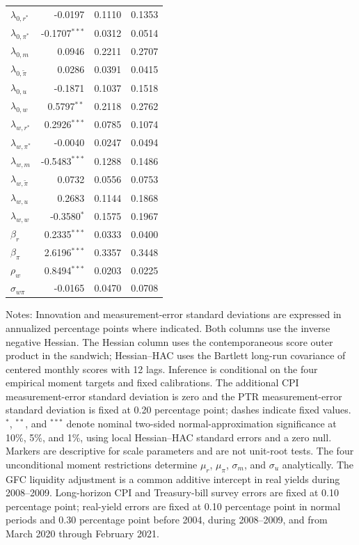\begin{table}[!htbp]
\begin{threeparttable}
\begin{tabular*}{\textwidth}{@{\extracolsep{\fill}}lrrr}
$\lambda_{0,r^*}$ & -0.0197 & 0.1110 & 0.1353 \\
$\lambda_{0,\pi^*}$ & -0.1707$^{***}$ & 0.0312 & 0.0514 \\
$\lambda_{0,m}$ & 0.0946 & 0.2211 & 0.2707 \\
$\lambda_{0,\widetilde\pi}$ & 0.0286 & 0.0391 & 0.0415 \\
$\lambda_{0,u}$ & -0.1871 & 0.1037 & 0.1518 \\
$\lambda_{0,w}$ & 0.5797$^{**}$ & 0.2118 & 0.2762 \\
$\lambda_{w,r^*}$ & 0.2926$^{***}$ & 0.0785 & 0.1074 \\
$\lambda_{w,\pi^*}$ & -0.0040 & 0.0247 & 0.0494 \\
$\lambda_{w,m}$ & -0.5483$^{***}$ & 0.1288 & 0.1486 \\
$\lambda_{w,\widetilde\pi}$ & 0.0732 & 0.0556 & 0.0753 \\
$\lambda_{w,u}$ & 0.2683 & 0.1144 & 0.1868 \\
$\lambda_{w,w}$ & -0.3580$^{*}$ & 0.1575 & 0.1967 \\
$\beta_r$ & 0.2335$^{***}$ & 0.0333 & 0.0400 \\
$\beta_\pi$ & 2.6196$^{***}$ & 0.3357 & 0.3448 \\
$\rho_w$ & 0.8494$^{***}$ & 0.0203 & 0.0225 \\
$\sigma_{w\pi}$ & -0.0165 & 0.0470 & 0.0708 \\
\bottomrule
\end{tabular*}
\begin{tablenotes}[flushleft]
\footnotesize
\item Notes: Innovation and measurement-error standard deviations are expressed in annualized percentage points where indicated. Both columns use the inverse negative Hessian. The Hessian column uses the contemporaneous score outer product in the sandwich; Hessian--HAC uses the Bartlett long-run covariance of centered monthly scores with 12 lags. Inference is conditional on the four empirical moment targets and fixed calibrations. The additional CPI measurement-error standard deviation is zero and the PTR measurement-error standard deviation is fixed at 0.20 percentage point; dashes indicate fixed values. $^*$, $^{**}$, and $^{***}$ denote nominal two-sided normal-approximation significance at 10\%, 5\%, and 1\%, using local Hessian--HAC standard errors and a zero null. Markers are descriptive for scale parameters and are not unit-root tests. The four unconditional moment restrictions determine $\mu_r$, $\mu_\pi$, $\sigma_m$, and $\sigma_u$ analytically. The GFC liquidity adjustment is a common additive intercept in real yields during 2008--2009. Long-horizon CPI and Treasury-bill survey errors are fixed at 0.10 percentage point; real-yield errors are fixed at 0.10 percentage point in normal periods and 0.30 percentage point before 2004, during 2008--2009, and from March 2020 through February 2021.
\end{tablenotes}
\end{threeparttable}
\end{table}
